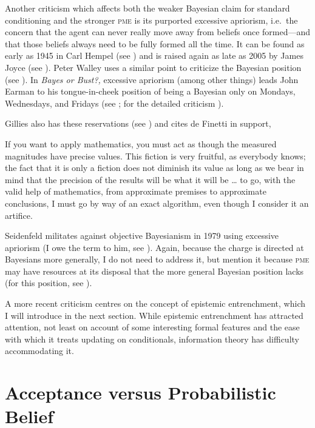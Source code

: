 \documentclass[phd,12pt,oneside]{ubcthesis}
\begin{document}
Another criticism which affects both the weaker Bayesian claim for
standard conditioning and the stronger \textsc{pme} is its purported
excessive apriorism, i.e.\ the concern that the agent can never really
move away from beliefs once formed---and that those beliefs always
need to be fully formed all the time. It can be found as early as 1945
in Carl Hempel (see ) and is raised again as
late as 2005 by James Joyce (see ). Peter
Walley uses a similar point to criticize the Bayesian position (see
). In \emph{Bayes or Bust?,} excessive
apriorism (among other things) leads John Earman to his
tongue-in-cheek position of being a Bayesian only on Mondays,
Wednesdays, and Fridays (see ; for the detailed
criticism ).

Gillies also has these reservations (see )
and cites de Finetti in support,

\begin{quotex}
    If you want to apply mathematics, you must act as though the measured
    magnitudes have precise values. This fiction is very fruitful, as
    everybody knows; the fact that it is only a fiction does not diminish
    its value as long as we bear in mind that the precision of the results
    will be what it will be {\ldots} to go, with the valid help of
    mathematics, from approximate premises to approximate conclusions, I
    must go by way of an exact algorithm, even though I consider it an
    artifice. 
\end{quotex}

Seidenfeld militates against objective Bayesianism in 1979 using
excessive apriorism (I owe the term to him, see
). Again, because the charge is directed
at Bayesians more generally, I do not need to address it, but mention
it because \textsc{pme} may have resources at its disposal that the
more general Bayesian position lacks (for this position, see
).

A more recent criticism centres on the concept of epistemic
entrenchment, which I will introduce in the next section. While
epistemic entrenchment has attracted attention, not least on account
of some interesting formal features and the ease with which it treats
updating on conditionals, information theory has difficulty
accommodating it. 

\section{Acceptance versus Probabilistic Belief}
\label{sec:iephahce}
\end{document}
